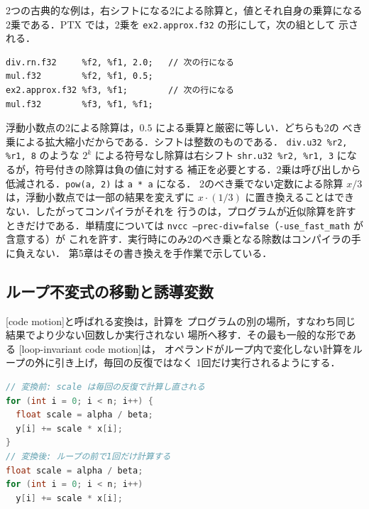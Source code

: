 \documentclass[../main.tex]{subfiles}
\begin{document}
2つの古典的な例は，右シフトになる2による除算と，値とそれ自身の乗算になる
2乗である．PTX では，2乗を \texttt{ex2.approx.f32} の形にして，次の組として
示される．
\begin{lstlisting}[language=PTX, numbers=none]
div.rn.f32     %f2, %f1, 2.0;   // 次の行になる
mul.f32        %f2, %f1, 0.5;
ex2.approx.f32 %f3, %f1;        // 次の行になる
mul.f32        %f3, %f1, %f1;
\end{lstlisting}
%
浮動小数点の2による除算は，$0.5$ による乗算と厳密に等しい．どちらも2の
べき乗による拡大縮小だからである．シフトは整数のものである．
\texttt{div.u32 \%r2, \%r1, 8} のような $2^k$ による符号なし除算は右シフト
\texttt{shr.u32 \%r2, \%r1, 3} になるが，符号付きの除算は負の値に対する
補正を必要とする．2乗は呼び出しから低減される．\texttt{pow(a, 2)} は
\texttt{a * a} になる．
2のべき乗でない定数による除算 $x/3$ は，浮動小数点では一部の結果を変えずに
$x\cdot(1/3)$ に置き換えることはできない．したがってコンパイラがそれを
行うのは，プログラムが近似除算を許すときだけである．単精度については
\texttt{nvcc --prec-div=false}（\texttt{-use\_fast\_math} が含意する）が
これを許す．実行時にのみ2のべき乗となる除数はコンパイラの手に負えない．
第5章はその書き換えを手作業で示している．

\subsection{ループ不変式の移動と誘導変数}

\begin{definition}[コード移動]
  \label{def:l11-code-motion}
  [code motion]と呼ばれる変換は，計算を
  プログラムの別の場所，すなわち同じ結果でより少ない回数しか実行されない
  場所へ移す．その最も一般的な形である
  [loop-invariant code motion]は，
  オペランドがループ内で変化しない計算をループの外に引き上げ，毎回の反復ではなく
  1回だけ実行されるようにする．
\end{definition}

\begin{lstlisting}[language=C++, numbers=none]
// 変換前: scale は毎回の反復で計算し直される
for (int i = 0; i < n; i++) {
  float scale = alpha / beta;
  y[i] += scale * x[i];
}
// 変換後: ループの前で1回だけ計算する
float scale = alpha / beta;
for (int i = 0; i < n; i++)
  y[i] += scale * x[i];
\end{lstlisting}
\end{document}
